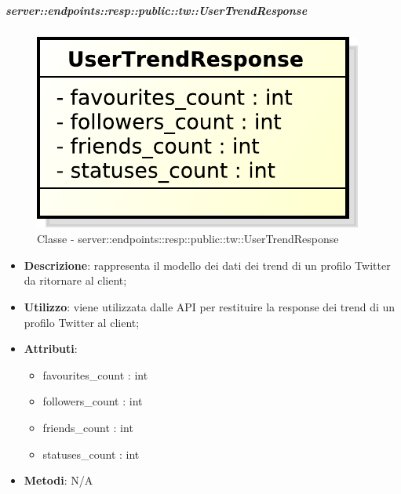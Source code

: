     \subparagraph{server::endpoints::resp::public::tw::UserTrendResponse} %
    \label{subp:bdsm_app_server_endpoints_resp_public_tw_usertrendresponse}
	\begin{figure}[!htbp]
		\centering
		\centerline{\includegraphics[scale=0.6]{./images/server/classes/endpoints/tw/user_trend_response.pdf}}
		\caption{Classe - server::endpoints::resp::public::tw::UserTrendResponse}
	\end{figure}
    \begin{itemize}
      \item \textbf{Descrizione}: rappresenta il modello dei dati dei trend di un profilo Twitter da ritornare al client;
      \item \textbf{Utilizzo}: viene utilizzata dalle API per restituire la response dei trend di un profilo Twitter al client;

	  \item \textbf{Attributi}:
	  	\begin{itemize}
	  		\item favourites\_count : int
	  		\item followers\_count : int
	  		\item friends\_count : int
	  		\item statuses\_count : int
	  	\end{itemize}
	  \item \textbf{Metodi}: N/A
    \end{itemize}

